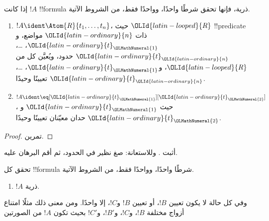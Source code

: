 \documentclass[../../../include/open-logic-section]{subfiles}
\begin{document}
\begin{prop}
إذا كانت $!A$ !!{formula} ذرية، فإنها تحقق شرطًا واحدًا، وواحدًا فقط،
من الشروط الآتية.
\begin{enumerate}
\item $!A \ident \Atom{R}{t_1,\dots,t_n}$، حيث $\OLId{latin-looped}{R}$ !!{predicate}
  ذات $\OLId{latin-ordinary}{n}$ مواضع، و$\OLId{latin-ordinary}{t}_\OLMathNumeral{1}$، \dots، $\OLId{latin-ordinary}{t}_\OLId{latin-ordinary}{n}$ حدود، ويُعيَّن كل من $\OLId{latin-looped}{R}$،
  و$\OLId{latin-ordinary}{t}_\OLMathNumeral{1}$، \dots، $\OLId{latin-ordinary}{t}_\OLId{latin-ordinary}{n}$ تعيينًا وحيدًا.
\item $!A \ident \eq[\OLId{latin-ordinary}{t}_\OLMathNumeral{1}][\OLId{latin-ordinary}{t}_\OLMathNumeral{2}]$، حيث $\OLId{latin-ordinary}{t}_\OLMathNumeral{1}$ و$\OLId{latin-ordinary}{t}_\OLMathNumeral{2}$ حدان معيّنان
  تعيينًا وحيدًا.
\end{enumerate}
\end{prop}

\begin{proof}
تمرين.
\end{proof}

\begin{prob}
أثبت . وللاستعانة: صغ نظير
 في الحدود، ثم أقم البرهان عليه.
\end{prob}

\begin{prop}
تحقق كل !!{formula} شرطًا واحدًا، وواحدًا فقط، من الشروط الآتية.
\begin{enumerate}
\item $!A$ ذرية.







\end{enumerate}
وفي كل حالة لا يكون تعيين $!B$، أو تعيين $!B$ و$!C$، إلا واحدًا.
ومن معنى ذلك مثلًا امتناع أزواج مختلفة $!B$، و$!C$، و$!B'$،
و$!C'$ بحيث تكون $!A$ من الصورتين
\end{prop}
\end{document}
